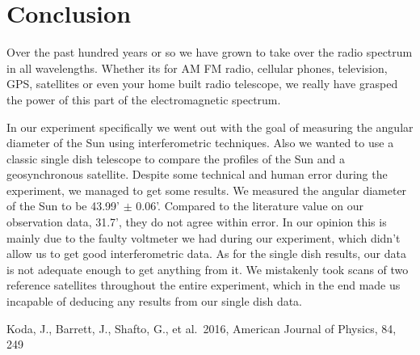 \documentclass{aastex61}
\begin{document}
\section{Conclusion}
Over the past hundred years or so we have grown to take over the radio spectrum in all wavelengths. Whether its for AM FM radio, cellular phones, television, GPS, satellites or even your home built radio telescope, we really have grasped the power of this part of the electromagnetic spectrum. 

In our experiment specifically we went out with the goal of measuring the angular diameter of the Sun using interferometric techniques. Also we wanted to use a classic single dish telescope to compare the profiles of the Sun and a geosynchronous satellite. Despite some technical and human error during the experiment, we managed to get some results. We measured the angular diameter of the Sun to be 43.99' $\pm$ 0.06'. Compared to the literature value on our observation data, 31.7', they do not agree within error. In our opinion this is mainly due to the faulty voltmeter we had during our experiment, which didn't allow us to get good interferometric data. As for the single dish results, our data is not adequate enough to get anything from it. We mistakenly took scans of two reference satellites throughout the entire experiment, which in the end made us incapable of deducing any results from our single dish data. 

\begin{thebibliography}{9}	
 Koda, J., Barrett, J., Shafto, G., et al.\ 2016, American Journal of Physics, 84, 249 
\end{thebibliography}
\end{document}
